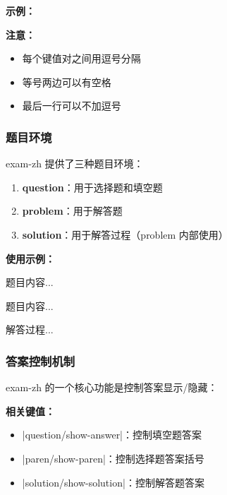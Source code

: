 \textbf{示例：}
\begin{latexcode}
\end{latexcode}

\textbf{注意：}
\begin{itemize}
  \item 每个键值对之间用逗号分隔
  \item 等号两边可以有空格
  \item 最后一行可以不加逗号
\end{itemize}

\subsubsection{题目环境}

exam-zh 提供了三种题目环境：

\begin{enumerate}
  \item \textbf{question}：用于选择题和填空题
  \item \textbf{problem}：用于解答题
  \item \textbf{solution}：用于解答过程（problem 内部使用）
\end{enumerate}

\textbf{使用示例：}
\begin{latexcode}
  \begin{question}[points = 5]
    题目内容...
  \end{question}

  \begin{problem}[points = 10]
    题目内容...
    \begin{solution}
      解答过程...
    \end{solution}
  \end{problem}
\end{latexcode}

\subsubsection{答案控制机制}

exam-zh 的一个核心功能是控制答案显示/隐藏：

\textbf{相关键值：}
\begin{itemize}
  \item |question/show-answer|：控制填空题答案
  \item |paren/show-paren|：控制选择题答案括号
  \item |solution/show-solution|：控制解答题答案
\end{itemize}


